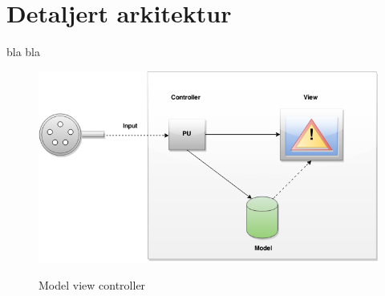 \section{Detaljert arkitektur} %
\label{sec:arkitektur}
bla bla
\newline
\begin{figure}[H]
	\centering
	\includegraphics[width=1.00\textwidth]{images/architecture2-mvc.png}
	\label{fig:mvc}
	\caption{Model view controller}
\end{figure}